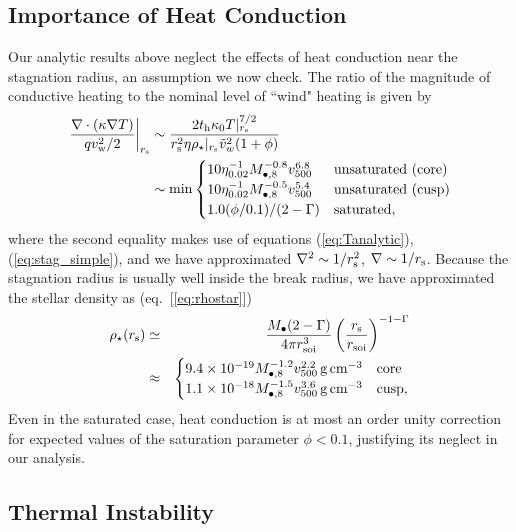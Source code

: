 \documentclass[usenatbib,fleqn]{mn2e}
\begin{document}
\subsection{Importance of Heat Conduction}

Our analytic results above neglect the effects of heat conduction near the stagnation radius, an assumption we now check.  The ratio of the magnitude of conductive heating to the nominal level of ``wind" heating is given by
\begin{align}
  \left.\frac{\nabla\cdot(\kappa \nabla T)}{q v_{\rm
w}^{2}/2}\right|_{r_{\rm s}} &\sim \frac{2t_{\rm h}\kappa_0
T|_{r_{\rm s}}^{7/2}}{r_{\rm s}^{2}\eta \rho_{\star}|_{r_{\rm s}} \tilde{v}_{w}^{2}(1+\phi)}
\nonumber \\ &\sim {\rm min}
  \begin{cases}
  10 \eta_{0.02}^{-1}
M_{\bullet,8}^{-0.8} v_{500}^{6.8} &  \text{unsaturated (core)}\\
 10 \eta_{0.02}^{-1}
M_{\bullet,8}^{-0.5} v_{500}^{5.4} &  \text{unsaturated (cusp)}\\
  1.0(\phi/0.1)/(2-\Gamma) & \text{saturated},
  \end{cases}
 \label{eq:rhors}
\end{align}
where the second equality makes use of equations (\ref{eq:Tanalytic}), (\ref{eq:stag_simple}), and we have approximated $\nabla^{2} \sim 1/r_{\rm s}^{2}$, $\nabla \sim 1/r_{\rm s}$.  Because the stagnation radius is usually well inside the break radius, we have approximated the stellar density as (eq.~[\ref{eq:rhostar}])
\begin{eqnarray}
  \rho_{\star}(r_{\rm s}) &\simeq& \frac{M_{\bullet}(2-\Gamma)}{4\pi r_{\rm soi}^{3}}\left(\frac{r_{\rm s}}{r_{\rm soi}}\right)^{-1-\Gamma} \nonumber \\
 &\approx& \begin{cases}
    9.4 \times 10^{-19}M_{\bullet,8}^{-1.2}v_{500}^{2.2}\,{\rm g\,cm^{-3}}
    & \text{core} \\
    1.1 \times 10^{-18} M_{\bullet,8}^{-1.5}v_{500}^{3.6}
    \,{\rm g\,cm^{-3}}  & \text{cusp}, 
  \end{cases}
  \label{eq:rhostarrs}
\end{eqnarray}
Even in the saturated case, heat conduction is at most an order unity correction for expected values of the saturation parameter $\phi < 0.1$, justifying its neglect in our analysis.  

\subsection{Thermal Instability}
\label{sec:instability}
\end{document}
